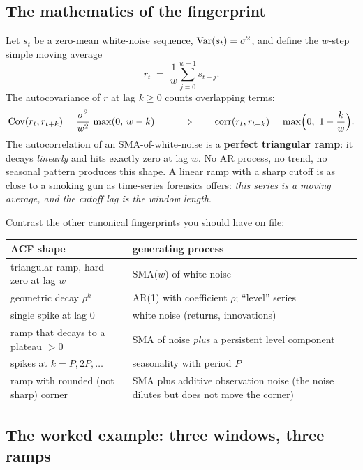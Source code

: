 \subsection{The mathematics of the fingerprint}

Let $s_t$ be a zero-mean white-noise sequence, $\operatorname{Var}(s_t)=\sigma^2$, and
define the $w$-step simple moving average
\[
r_t \;=\; \frac{1}{w}\sum_{j=0}^{w-1} s_{t+j}.
\]
The autocovariance of $r$ at lag $k \ge 0$ counts overlapping terms:
\begin{equation}
\operatorname{Cov}(r_t, r_{t+k})
= \frac{\sigma^2}{w^2}\,\max(0,\, w-k)
\qquad\Longrightarrow\qquad
\operatorname{corr}(r_t, r_{t+k}) = \max\!\Big(0,\ 1-\frac{k}{w}\Big).
\label{eq:smaacf}
\end{equation}
The autocorrelation of an SMA-of-white-noise is a \textbf{perfect triangular
ramp}: it decays \emph{linearly} and hits exactly zero at lag $w$. No AR
process, no trend, no seasonal pattern produces this shape. A linear ramp
with a sharp cutoff is as close to a smoking gun as time-series forensics
offers: \emph{this series is a moving average, and the cutoff lag is the
window length}.

Contrast the other canonical fingerprints you should have on file:

\begin{center}
\begin{tabularx}{\textwidth}{@{}lX@{}}
\toprule
ACF shape & generating process \\
\midrule
triangular ramp, hard zero at lag $w$ & SMA($w$) of white noise \\
geometric decay $\rho^k$ & AR(1) with coefficient $\rho$; ``level'' series \\
single spike at lag 0 & white noise (returns, innovations) \\
ramp that decays to a plateau $>0$ & SMA of noise \emph{plus} a persistent
level component \\
spikes at $k = P, 2P, \dots$ & seasonality with period $P$ \\
ramp with rounded (not sharp) corner & SMA plus additive observation noise
(the noise dilutes but does not move the corner) \\
\bottomrule
\end{tabularx}
\end{center}

\subsection{The worked example: three windows, three ramps}

